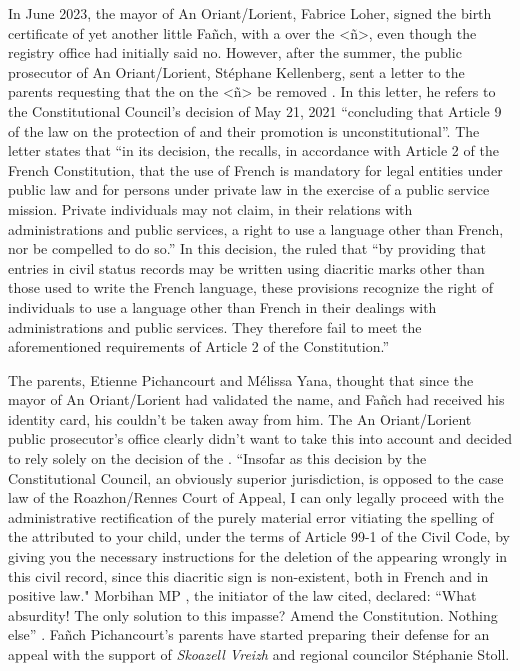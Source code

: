 \documentclass[output=paper,colorlinks,citecolor=brown]{langscibook}
\begin{document}
In June 2023, the mayor of An Oriant/Lorient, Fabrice Loher, signed the birth certificate of yet another little Fañch, with a  over the <ñ>, even though the registry office had initially said no. However, after the summer, the public prosecutor of An Oriant/Lorient, Stéphane Kellenberg, sent a letter to the parents requesting that the  on the <ñ> be removed \citep{sm:James2023}. In this letter, he refers to the Constitutional Council's decision of May 21, 2021 “concluding that Article 9 of the law on the protection of  and their promotion is unconstitutional”. The letter states that “in its decision, the  recalls, in accordance with Article 2 of the French Constitution, that the use of French is mandatory for legal entities under public law and for persons under private law in the exercise of a public service mission. Private individuals may not claim, in their relations with administrations and public services, a right to use a language other than French, nor be compelled to do so.” In this decision, the  ruled that “by providing that entries in civil status records may be written using diacritic marks other than those used to write the French language, these provisions recognize the right of individuals to use a language other than French in their dealings with administrations and public services. They therefore fail to meet the aforementioned requirements of Article 2 of the Constitution.”

The parents, Etienne Pichancourt and Mélissa Yana, thought that since the mayor of An Oriant/Lorient had validated the name, and Fañch had received his identity card, his  couldn't be taken away from him. The An Oriant/Lorient public prosecutor's office clearly didn't want to take this into account and decided to rely solely on the decision of the . ``Insofar as this decision by the Constitutional Council, an obviously superior jurisdiction, is opposed to the case law of the Roazhon/Rennes Court of Appeal, I can only legally proceed with the administrative rectification of the purely material error vitiating the spelling of the  attributed to your child, under the terms of Article 99-1 of the Civil Code, by giving you the necessary instructions for the deletion of the  appearing wrongly in this civil record, since this diacritic sign is non-existent, both in French and in positive law." Morbihan MP , the initiator of the law cited, declared: ``What absurdity! The only solution to this impasse? Amend the Constitution. Nothing else” \citep{sm:Etienne2023}. Fañch Pichancourt’s parents have started preparing their defense for an appeal with the support of \textit{Skoazell Vreizh} and regional councilor Stéphanie Stoll.
\end{document}
